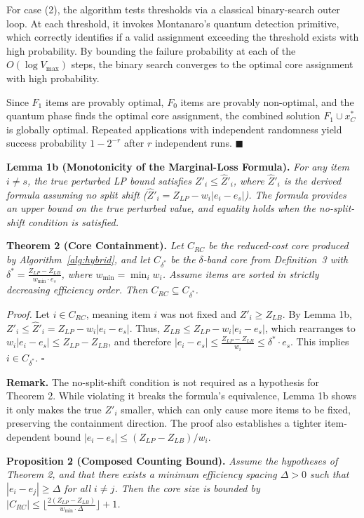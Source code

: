 \documentclass[conference]{IEEEtran} \IEEEoverridecommandlockouts
\begin{document}
For case (2), the algorithm tests thresholds via a classical binary-search outer loop. At each threshold, it invokes Montanaro's quantum detection primitive, which correctly identifies if a valid assignment exceeding the threshold exists with high probability. By bounding the failure probability at each of the $O(\log V_{\max})$ steps, the binary search converges to the optimal core assignment with high probability.

Since $F_1$ items are provably optimal, $F_0$ items are provably non-optimal, and the quantum phase finds the optimal core assignment, the combined solution $F_1 \cup x^*_C$ is globally optimal. Repeated applications with independent randomness yield success probability $1 - 2^{-r}$ after $r$ independent runs. \hfill$\blacksquare$

\textbf{Lemma 1b (Monotonicity of the Marginal-Loss Formula).} \label{lem:monotonicity} \textit{For any item $i \ne s$, the true perturbed LP bound satisfies $Z'_i \le \hat{Z}'_i$, where $\hat{Z}'_i$ is the derived formula assuming no split shift ($\hat{Z}'_i = Z_{LP} - w_i |e_i - e_s|$). The formula provides an upper bound on the true perturbed value, and equality holds when the no-split-shift condition is satisfied.}

\textbf{Theorem 2 (Core Containment).} \textit{Let $C_{RC}$ be the reduced-cost core produced by Algorithm~\ref{alg:hybrid}, and let $C_{\delta^*}$ be the $\delta$-band core from Definition~3 with $\delta^* = \frac{Z_{LP} - Z_{LB}}{w_{\min} \cdot e_s}$, where $w_{\min} = \min_{i} w_i$. Assume items are sorted in strictly decreasing efficiency order. Then $C_{RC} \subseteq C_{\delta^*}$.}

\textit{Proof.} Let $i \in C_{RC}$, meaning item $i$ was not fixed and $Z'_i \ge Z_{LB}$. By Lemma 1b, $Z'_i \le \hat{Z}'_i = Z_{LP} - w_i |e_i - e_s|$. Thus, $Z_{LB} \le Z_{LP} - w_i |e_i - e_s|$, which rearranges to $w_i |e_i - e_s| \le Z_{LP} - Z_{LB}$, and therefore $|e_i - e_s| \le \frac{Z_{LP} - Z_{LB}}{w_i} \le \delta^* \cdot e_s$. This implies $i \in C_{\delta^*}$. $\square$

\textbf{Remark.} The no-split-shift condition is not required as a hypothesis for Theorem 2. While violating it breaks the formula's equivalence, Lemma 1b shows it only makes the true $Z'_i$ smaller, which can only cause more items to be fixed, preserving the containment direction. The proof also establishes a tighter item-dependent bound $|e_i - e_s| \le (Z_{LP} - Z_{LB})/w_i$.

\textbf{Proposition 2 (Composed Counting Bound).} \textit{Assume the hypotheses of Theorem 2, and that there exists a minimum efficiency spacing $\Delta > 0$ such that $|e_i - e_j| \ge \Delta$ for all $i \ne j$. Then the core size is bounded by $|C_{RC}| \le \lfloor \frac{2(Z_{LP} - Z_{LB})}{w_{\min} \cdot \Delta} \rfloor + 1$.}
\end{document}
